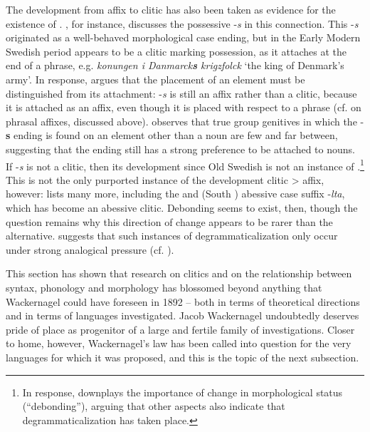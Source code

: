 The development from affix to clitic has also been taken as evidence for the existence of . \citet{Norde2001}, for instance, discusses the  possessive -\textit{s} in this connection. This -\textit{s} originated as a well-behaved morphological  case ending, but in the Early Modern Swedish period appears to be a clitic marking possession, as it attaches at the end of a phrase, e.g. \textit{konungen i Danmarck\textbf{s} krigzfolck} `the king of Denmark's army'. In response, \citet{Boerjars2003} argues that the placement of an element must be distinguished from its attachment:  -\textit{s} is still an affix rather than a clitic, because it is attached as an affix, even though it is placed with respect to a phrase (cf. \citet{Anderson1993} on phrasal affixes, discussed above). \citeauthor{Boerjars2003} observes that true group genitives in which the -\textbf{s} ending is found on an element other than a noun are few and far between, suggesting that the ending still has a strong preference to be attached to nouns. If -\textit{s} is not a clitic, then its development since Old Swedish is not an instance of .\footnote{In response, \citet{Norde2010} downplays the importance of change in morphological status (``debonding''), arguing that other aspects also indicate that degrammaticalization has taken place.} This is not the only purported instance of the development clitic > affix, however: \citet{Kiparsky2012} lists many more, including the  and  (South ) abessive case suffix -\textit{lta}, which has become an abessive clitic. Debonding seems to exist, then, though the question remains why this direction of change appears to be rarer than the alternative. \citet{Kiparsky2012} suggests that such instances of degrammaticalization only occur under strong analogical pressure (cf. \citealp{Plank1995}).

This section has shown that research on clitics and on the relationship between syntax, phonology and morphology has blossomed beyond anything that Wackernagel could have foreseen in 1892 -- both in terms of theoretical directions and in terms of languages investigated. Jacob Wackernagel undoubtedly deserves pride of place as progenitor of a large and fertile family of investigations. Closer to home, however, Wackernagel's law has been called into question for the very languages for which it was proposed, and this is the topic of the next subsection.

